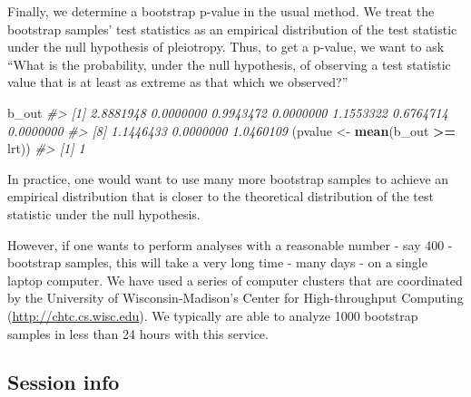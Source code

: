 \documentclass[oneside]{book}\usepackage[]{graphicx}\usepackage[]{color}
\newenvironment{Shaded}{\begin{snugshade}}{\end{snugshade}}
\newcommand{\CommentTok}[1]{\textcolor[rgb]{0.56,0.35,0.01}{\textit{#1}}}
\newcommand{\KeywordTok}[1]{\textcolor[rgb]{0.13,0.29,0.53}{\textbf{#1}}}
\newcommand{\NormalTok}[1]{#1}
\newcommand{\OperatorTok}[1]{\textcolor[rgb]{0.81,0.36,0.00}{\textbf{#1}}}
\newcommand{\StringTok}[1]{\textcolor[rgb]{0.31,0.60,0.02}{#1}}
\begin{document}
Finally, we determine a bootstrap p-value in the usual method. We treat
the bootstrap samples' test statistics as an empirical distribution of
the test statistic under the null hypothesis of pleiotropy. Thus, to get
a p-value, we want to ask ``What is the probability, under the null
hypothesis, of observing a test statistic value that is at least as
extreme as that which we observed?''

\begin{Shaded}
\begin{Highlighting}[]
\NormalTok{b_out}
\CommentTok{#>  [1] 2.8881948 0.0000000 0.9943472 0.0000000 1.1553322 0.6764714 0.0000000}
\CommentTok{#>  [8] 1.1446433 0.0000000 1.0460109}
\NormalTok{(pvalue <-}\StringTok{ }\KeywordTok{mean}\NormalTok{(b_out }\OperatorTok{>=}\StringTok{ }\NormalTok{lrt))}
\CommentTok{#> [1] 1}
\end{Highlighting}
\end{Shaded}

In practice, one would want to use many more bootstrap samples to
achieve an empirical distribution that is closer to the theoretical
distribution of the test statistic under the null hypothesis.

However, if one wants to perform analyses with a reasonable number - say
400 - bootstrap samples, this will take a very long time - many days -
on a single laptop computer. We have used a series of computer clusters
that are coordinated by the University of Wisconsin-Madison's Center for
High-throughput Computing (\url{http://chtc.cs.wisc.edu}). We typically
are able to analyze 1000 bootstrap samples in less than 24 hours with
this service.

\hypertarget{session-info}{%
\subsection{Session info}\label{session-info}}
\end{document}
